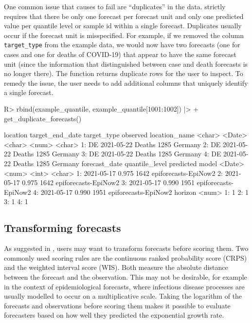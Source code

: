 \documentclass[
]{jss}
\begin{document}
One common issue that causes  to fail are
``duplicates'' in the data.  strictly requires that
there be only one forecast per forecast unit and only one predicted
value per quantile level or sample id within a single forecast.
Duplicates usually occur if the forecast unit is misspecified. For
example, if we removed the column \texttt{target\_type} from the example
data, we would now have two forecasts (one for cases and one for deaths
of COVID-19) that appear to have the same forecast unit (since the
information that distinguished between case and death forecasts is no
longer there). The function  returns
duplicate rows for the user to inspect. To remedy the issue, the user
needs to add additional columns that uniquely identify a single
forecast.

\begin{CodeChunk}
\begin{CodeInput}
R> rbind(example_quantile, example_quantile[1001:1002]) |>
+   get_duplicate_forecasts() 
\end{CodeInput}
\begin{CodeOutput}
   location target_end_date target_type observed location_name
     <char>          <Date>      <char>    <num>        <char>
1:       DE      2021-05-22      Deaths     1285       Germany
2:       DE      2021-05-22      Deaths     1285       Germany
3:       DE      2021-05-22      Deaths     1285       Germany
4:       DE      2021-05-22      Deaths     1285       Germany
   forecast_date quantile_level predicted                model
          <Date>          <num>     <int>               <char>
1:    2021-05-17          0.975      1642 epiforecasts-EpiNow2
2:    2021-05-17          0.975      1642 epiforecasts-EpiNow2
3:    2021-05-17          0.990      1951 epiforecasts-EpiNow2
4:    2021-05-17          0.990      1951 epiforecasts-EpiNow2
   horizon
     <num>
1:       1
2:       1
3:       1
4:       1
\end{CodeOutput}
\end{CodeChunk}

\subsection{Transforming forecasts}\label{transforming-forecasts}

As suggested in \cite{bosseScoringEpidemiologicalForecasts2023}, users
may want to transform forecasts before scoring them. Two commonly used
scoring rules are the continuous ranked probability score (CRPS) and the
weighted interval score (WIS). Both measure the absolute distance
between the forecast and the observation. This may not be desirable, for
example in the context of epidemiological forecasts, where infectious
disease processes are usually modelled to occur on a multiplicative
scale. Taking the logarithm of the forecasts and observations before
scoring them makes it possible to evaluate forecasters based on how well
they predicted the exponential growth rate.
\end{document}
